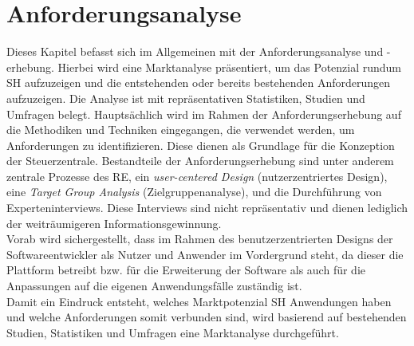 \chapter{Anforderungsanalyse}
\label{chap:anforderungsanalyse}
    Dieses Kapitel befasst sich im Allgemeinen mit der Anforderungsanalyse und -erhebung. Hierbei wird eine
    Marktanalyse präsentiert, um das Potenzial rundum \acl{SH} aufzuzeigen und die entstehenden oder bereits 
    bestehenden Anforderungen aufzuzeigen. Die Analyse ist 
    mit repräsentativen Statistiken, Studien und Umfragen belegt. Hauptsächlich wird im Rahmen der Anforderungserhebung 
    auf die Methodiken und Techniken eingegangen, die verwendet werden, um 
    Anforderungen zu identifizieren. Diese dienen als Grundlage für die Konzeption der Steuerzentrale. Bestandteile der 
    Anforderungserhebung sind unter anderem zentrale Prozesse des \acl{RE}, ein \textit{user-centered Design} (nutzerzentriertes Design), 
    eine \textit{Target Group Analysis} (Zielgruppenanalyse), und die Durchführung von 
    Experteninterviews. Diese Interviews sind nicht repräsentativ und dienen lediglich der weiträumigeren Informationsgewinnung. 
    \\
    Vorab wird sichergestellt, dass im Rahmen des benutzerzentrierten Designs der Softwareentwickler als Nutzer und Anwender im 
    Vordergrund steht, da dieser die Plattform betreibt bzw. für die Erweiterung der Software als auch für die 
    Anpassungen auf die eigenen Anwendungsfälle zuständig ist.
    \\
    \linebreak
    Damit ein Eindruck entsteht, welches Marktpotenzial \acl{SH} Anwendungen haben und welche Anforderungen somit 
    verbunden sind, wird basierend auf bestehenden Studien, Statistiken und Umfragen eine Marktanalyse durchgeführt.

